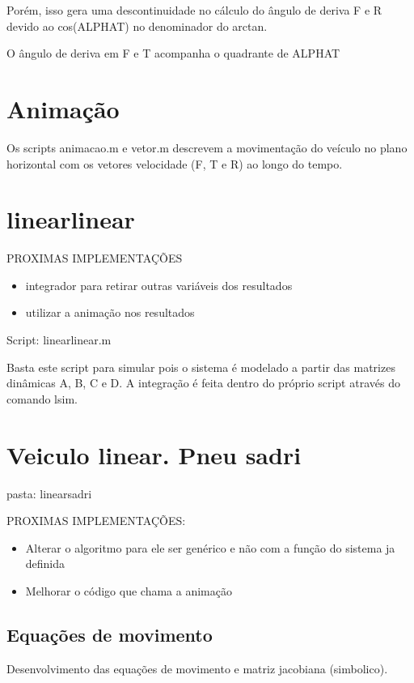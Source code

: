\documentclass[sublist]{fei}
\begin{document}
Porém, isso gera uma descontinuidade no cálculo do ângulo de deriva F e R devido ao cos(ALPHAT) no denominador do arctan.

O ângulo de deriva em F e T acompanha o quadrante de ALPHAT


\chapter{Animação}

Os scripts animacao.m e vetor.m descrevem a movimentação do veículo no plano horizontal com os vetores velocidade (F, T e R) ao longo do tempo.


\chapter{linearlinear} 

PROXIMAS IMPLEMENTAÇÕES

\begin{itemize}
\item integrador para retirar outras variáveis dos resultados
\item utilizar a animação nos resultados
\end{itemize}



Script: linearlinear.m

Basta este script para simular pois o sistema é modelado a partir das matrizes dinâmicas A, B, C e D. A integração é feita dentro do próprio script através do comando lsim.

\chapter{Veiculo linear. Pneu sadri} 

pasta: linearsadri

PROXIMAS IMPLEMENTAÇÕES:

\begin{itemize}
\item Alterar o algoritmo para ele ser genérico e não com a função do sistema ja definida
\item Melhorar o código que chama a animação
\end{itemize}

\section{Equações de movimento}

Desenvolvimento das equações de movimento e matriz jacobiana (simbolico).
\end{document}
